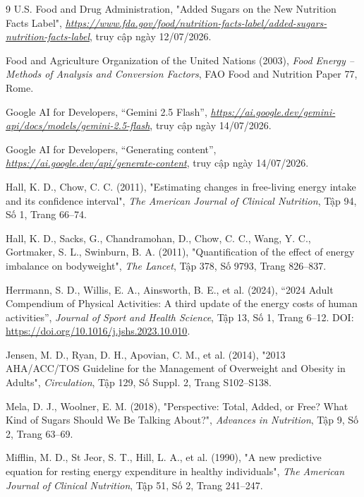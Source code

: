 \documentclass[12pt, a4paper]{report}
\begin{document}
\begin{thebibliography}{9}
U.S. Food and Drug Administration,
"Added Sugars on the New Nutrition Facts Label",
\textit{\url{https://www.fda.gov/food/nutrition-facts-label/added-sugars-nutrition-facts-label}}, truy cập ngày 12/07/2026.

Food and Agriculture Organization of the United Nations (2003),
\textit{Food Energy -- Methods of Analysis and Conversion Factors},
FAO Food and Nutrition Paper 77, Rome.

Google AI for Developers, ``Gemini 2.5 Flash'',
\textit{\url{https://ai.google.dev/gemini-api/docs/models/gemini-2.5-flash}},
truy cập ngày 14/07/2026.

Google AI for Developers, ``Generating content'',
\textit{\url{https://ai.google.dev/api/generate-content}},
truy cập ngày 14/07/2026.

Hall, K. D., Chow, C. C. (2011),
"Estimating changes in free-living energy intake and its confidence interval",
\textit{The American Journal of Clinical Nutrition}, Tập 94, Số 1, Trang 66--74.

Hall, K. D., Sacks, G., Chandramohan, D., Chow, C. C., Wang, Y. C., Gortmaker, S. L., Swinburn, B. A. (2011),
"Quantification of the effect of energy imbalance on bodyweight",
\textit{The Lancet}, Tập 378, Số 9793, Trang 826--837.

Herrmann, S. D., Willis, E. A., Ainsworth, B. E., et al. (2024),
``2024 Adult Compendium of Physical Activities: A third update of the energy costs of human activities'',
\textit{Journal of Sport and Health Science},
Tập 13, Số 1, Trang 6--12.
DOI: \url{https://doi.org/10.1016/j.jshs.2023.10.010}.

Jensen, M. D., Ryan, D. H., Apovian, C. M., et al. (2014),
"2013 AHA/ACC/TOS Guideline for the Management of Overweight and Obesity in Adults",
\textit{Circulation}, Tập 129, Số Suppl. 2, Trang S102--S138.

Mela, D. J., Woolner, E. M. (2018),
"Perspective: Total, Added, or Free? What Kind of Sugars Should We Be Talking About?",
\textit{Advances in Nutrition}, Tập 9, Số 2, Trang 63--69.

Mifflin, M. D., St Jeor, S. T., Hill, L. A., et al. (1990),
"A new predictive equation for resting energy expenditure in healthy individuals",
\textit{The American Journal of Clinical Nutrition}, Tập 51, Số 2, Trang 241--247.


\end{thebibliography}
\end{document}
